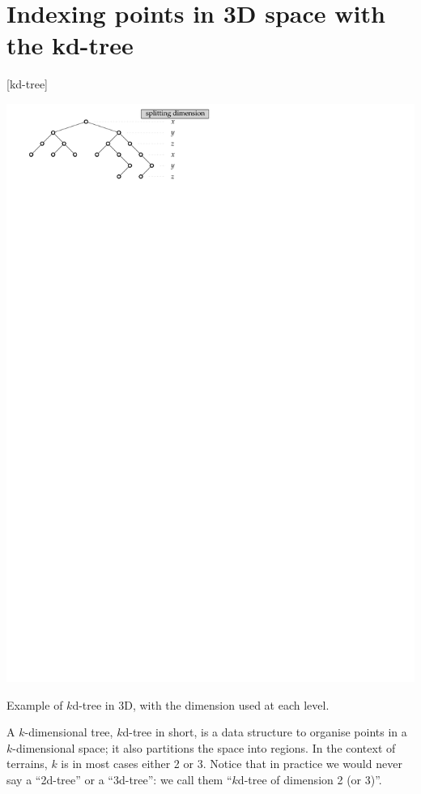 %
\section{Indexing points in 3D space with the kd-tree}[kd-tree]%
\label{sec:kdtree}

\begin{marginfigure}
  \centering
  \includegraphics[width=\linewidth]{figs/kdtree}
  \caption{Example of $k$d-tree in 3D, with the dimension used at each level.}%
\end{marginfigure} 

A $k$-dimensional tree, $k$d-tree in short, is a data structure to organise points in a $k$-dimensional space; it also partitions the space into regions.
In the context of terrains, $k$ is in most cases either 2 or 3.
Notice that in practice we would never say a ``2d-tree'' or a ``3d-tree'': we call them ``$k$d-tree of dimension 2 (or 3)''.

